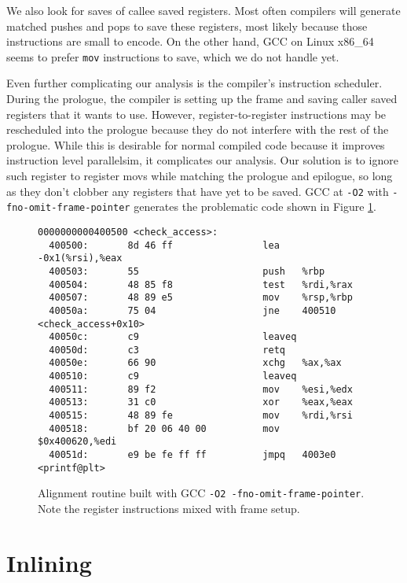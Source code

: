 We also look for saves of callee saved registers.  Most often compilers will
generate matched pushes and pops to save these registers, most likely because
those instructions are small to encode.  On the other hand, GCC on Linux x86\_64
seems to prefer {\tt mov} instructions to save, which we do not handle yet.

Even further complicating our analysis is the compiler's instruction scheduler.
During the prologue, the compiler is setting up the frame and saving caller
saved registers that it wants to use.  However, register-to-register
instructions may be rescheduled into the prologue because they do not interfere
with the rest of the prologue.  While this is desirable for normal compiled code
because it improves instruction level parallelsim, it complicates our analysis.
Our solution is to ignore such register to register movs while matching the
prologue and epilogue, so long as they don't clobber any registers that have yet
to be saved.  GCC at {\tt -O2} with {\tt -fno-omit-frame-pointer} generates the
problematic code shown in Figure \ref{fig:scheduled_prologue}.

\begin{figure}
\begin{verbatim}
0000000000400500 <check_access>:
  400500:       8d 46 ff                lea    -0x1(%rsi),%eax
  400503:       55                      push   %rbp
  400504:       48 85 f8                test   %rdi,%rax
  400507:       48 89 e5                mov    %rsp,%rbp
  40050a:       75 04                   jne    400510 <check_access+0x10>
  40050c:       c9                      leaveq 
  40050d:       c3                      retq   
  40050e:       66 90                   xchg   %ax,%ax
  400510:       c9                      leaveq 
  400511:       89 f2                   mov    %esi,%edx
  400513:       31 c0                   xor    %eax,%eax
  400515:       48 89 fe                mov    %rdi,%rsi
  400518:       bf 20 06 40 00          mov    $0x400620,%edi
  40051d:       e9 be fe ff ff          jmpq   4003e0 <printf@plt>
\end{verbatim}
\caption{Alignment routine built with GCC {\tt -O2 -fno-omit-frame-pointer}.
Note the register instructions mixed with frame setup.}
\label{fig:scheduled_prologue}
\end{figure}

\section{Inlining}
\label{sec:inlining}

